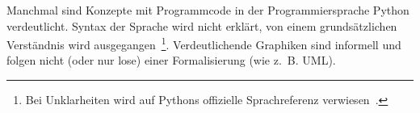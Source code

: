 \documentclass[12pt,a4paper,ngerman]{article}
\begin{document}
\bigskip

Manchmal sind Konzepte mit Programmcode in der Programmiersprache Python verdeutlicht.
Syntax der Sprache wird nicht erklärt, von einem grundsätzlichen Verständnis wird ausgegangen~\footnote{%
    Bei Unklarheiten wird auf Pythons offizielle Sprachreferenz verwiesen~\parencite{pythonLanguageReference}.
}.
Verdeutlichende Graphiken sind informell und folgen nicht (oder nur lose) einer Formalisierung (wie z.~B. UML).


%


%

\end{document}
